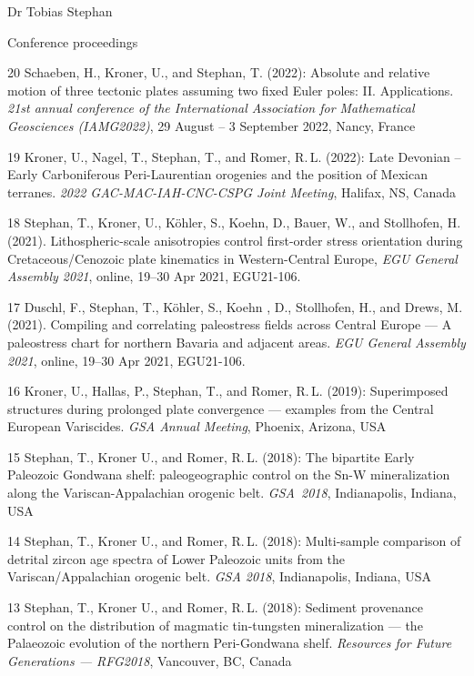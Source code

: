 \documentclass[10pt, paper=letter]{scrartcl} %
\begin{document}
\begin{cv}{Dr Tobias Stephan}
\begin{cvlist}{Conference proceedings}
    \item[20] Schaeben, H., Kroner, U., and Stephan, T. (2022): Absolute and relative motion of three tectonic plates assuming two fixed Euler poles: II. Applications. \textit{21st annual conference of the International Association for Mathematical Geosciences (IAMG2022)}, 29 August -- 3 September 2022, Nancy, France
    \item[19] Kroner, U., Nagel, T., Stephan, T., and Romer, R.\,L. (2022): Late Devonian – Early Carboniferous Peri-Laurentian orogenies and the position of Mexican terranes. \textit{2022 GAC-MAC-IAH-CNC-CSPG Joint Meeting}, Halifax, NS, Canada
    \item[18] Stephan, T., Kroner, U., K\"ohler, S., Koehn, D., Bauer, W., and Stollhofen, H. (2021). Lithospheric-scale anisotropies control first-order stress orientation during Cretaceous\-/Cenozoic plate kinematics in Western-Central Europe, \textit{EGU General Assembly 2021}, online, 19--30 Apr 2021, EGU21-106. 
    \item[17] Duschl, F., Stephan, T., K\"ohler, S., Koehn , D., Stollhofen, H., and Drews, M. (2021). Compiling and correlating paleostress fields across Central Europe --- A paleostress chart for northern Bavaria and adjacent areas. \textit{EGU General Assembly 2021}, online, 19--30 Apr 2021, EGU21-106. 
    \item[16] Kroner, U., Hallas, P., Stephan, T., and Romer, R.\,L. (2019): Superimposed structures during prolonged plate convergence --- examples from the Central European Variscides. \textit{GSA Annual Meeting}, Phoenix, Arizona, USA
    \item[15] Stephan, T., Kroner U., and Romer, R.\,L. (2018): The bipartite Early Paleozoic Gondwana shelf: paleogeographic control on the Sn-W mineralization along the Variscan-Appalachian orogenic belt. \mbox{\textit{GSA 2018}}, Indianapolis, Indiana, USA
    \item[14] Stephan, T., Kroner U., and Romer, R.\,L. (2018): Multi-sample comparison of detrital zircon age spectra of Lower Paleozoic units from the Variscan\-/Appalachian orogenic belt. \textit{GSA 2018}, Indianapolis, Indiana, USA
    \item[13] Stephan, T., Kroner U., and Romer, R.\,L. (2018): Sediment provenance control on the distribution of magmatic tin-tungsten mineralization --- the Palaeozoic evolution of the northern Peri-Gondwana shelf. \textit{Resources for Future Generations --- RFG2018}, Vancouver, BC, Canada

\end{cvlist}
\end{cv}
\end{document}
